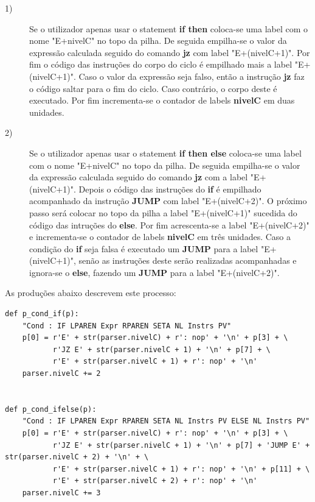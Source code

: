 \documentclass{article}
\begin{document}
\begin{description}
\item[1)] Se o utilizador apenas usar o statement \textbf{if then} coloca-se uma label com o nome "E+nivelC" no topo da pilha. De seguida empilha-se o valor da expressão calculada seguido do comando \textbf{jz} com label "E+(nivelC+1)". Por fim o código das instruções do corpo do ciclo é empilhado mais a label "E+(nivelC+1)". Caso o valor da expressão seja falso, então a instrução \textbf{jz} faz o código saltar para o fim do ciclo. Caso contrário, o corpo deste é executado. Por fim incrementa-se o contador de labels \textbf{nivelC} em duas unidades.

\item[2)] Se o utilizador apenas usar o statement \textbf{if then else} coloca-se uma label com o nome "E+nivelC" no topo da pilha. 
De seguida empilha-se o valor da expressão calculada seguido do comando \textbf{jz} com a label "E+(nivelC+1)". Depois o código das instruções do \textbf{if} é empilhado acompanhado da instrução \textbf{JUMP} com label "E+(nivelC+2)". O próximo passo será colocar no topo da pilha a label "E+(nivelC+1)" sucedida do código das intruções do \textbf{else}. Por fim acrescenta-se a label "E+(nivelC+2)" e incrementa-se o contador de labels \textbf{nivelC} em três unidades. Caso a condição do \textbf{if} seja falsa é executado um \textbf{JUMP} para a label "E+(nivelC+1)", senão as instruções deste serão realizadas acompanhadas e ignora-se o \textbf{else}, fazendo um \textbf{JUMP} para a label "E+(nivelC+2)".

\end{description}
As produções abaixo descrevem este processo:

\begin{lstlisting}[firstnumber=303]
def p_cond_if(p):
    "Cond : IF LPAREN Expr RPAREN SETA NL Instrs PV"
    p[0] = r'E' + str(parser.nivelC) + r': nop' + '\n' + p[3] + \
           r'JZ E' + str(parser.nivelC + 1) + '\n' + p[7] + \
           r'E' + str(parser.nivelC + 1) + r': nop' + '\n'
    parser.nivelC += 2


def p_cond_ifelse(p):
    "Cond : IF LPAREN Expr RPAREN SETA NL Instrs PV ELSE NL Instrs PV"
    p[0] = r'E' + str(parser.nivelC) + r': nop' + '\n' + p[3] + \
           r'JZ E' + str(parser.nivelC + 1) + '\n' + p[7] + 'JUMP E' + str(parser.nivelC + 2) + '\n' + \
           r'E' + str(parser.nivelC + 1) + r': nop' + '\n' + p[11] + \
           r'E' + str(parser.nivelC + 2) + r': nop' + '\n'
    parser.nivelC += 3
\end{lstlisting}
\end{document}
